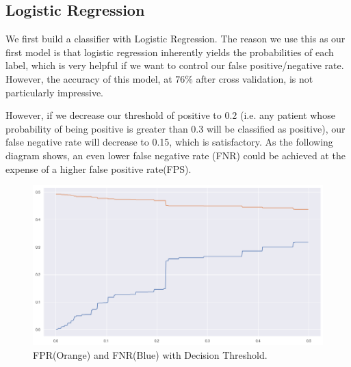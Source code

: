 \documentclass[a4paper, 11pt]{article}
\begin{document}
\subsection*{Logistic Regression}
We first build a classifier with Logistic Regression. The reason we use this as our first model is that logistic regression inherently yields the probabilities of each label, which is very helpful if we want to control our false positive/negative rate. However, the accuracy of this model, at $76\%$ after cross validation, is not particularly impressive.\par
However, if we decrease our threshold of positive to 0.2 (i.e. any patient whose probability of being positive is greater than 0.3 will be classified as positive), our false negative rate will decrease to 0.15, which is satisfactory. As the following diagram shows, an even lower false negative rate (FNR) could be achieved at the expense of a higher false positive rate(FPS).\par
\begin{figure}[H]
\centering
\includegraphics[scale=0.4]{fps.png}
\caption{FPR(Orange) and FNR(Blue) with Decision Threshold.}
\label{Confirmed Cases}
\end{figure}
\end{document}
